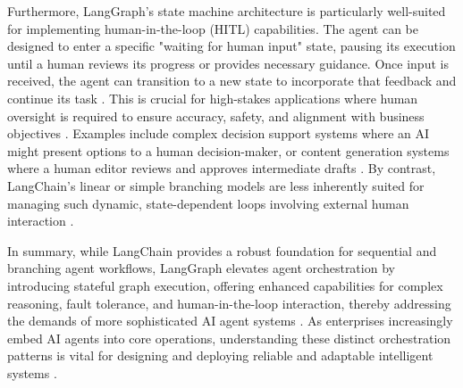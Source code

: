 Furthermore, LangGraph's state machine architecture is particularly well-suited for implementing human-in-the-loop (HITL) capabilities. The agent can be designed to enter a specific "waiting for human input" state, pausing its execution until a human reviews its progress or provides necessary guidance. Once input is received, the agent can transition to a new state to incorporate that feedback and continue its task \cite{LangGraphDocs}. This is crucial for high-stakes applications where human oversight is required to ensure accuracy, safety, and alignment with business objectives \cite{Reger2026}. Examples include complex decision support systems where an AI might present options to a human decision-maker, or content generation systems where a human editor reviews and approves intermediate drafts \cite{LangGraphDocs}. By contrast, LangChain's linear or simple branching models are less inherently suited for managing such dynamic, state-dependent loops involving external human interaction \cite{Reger2026}.

In summary, while LangChain provides a robust foundation for sequential and branching agent workflows, LangGraph elevates agent orchestration by introducing stateful graph execution, offering enhanced capabilities for complex reasoning, fault tolerance, and human-in-the-loop interaction, thereby addressing the demands of more sophisticated AI agent systems \cite{LangGraphDocs}. As enterprises increasingly embed AI agents into core operations, understanding these distinct orchestration patterns is vital for designing and deploying reliable and adaptable intelligent systems \cite{Reger2026}.
